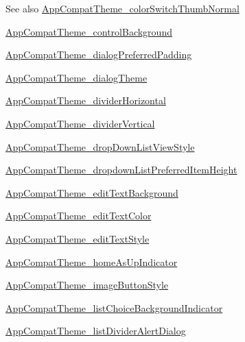 \begin{DoxySeeAlso}{See also}
\hyperlink{classandroid_1_1support_1_1v4_1_1R_1_1styleable_ae369a455853f8d39ed5e796399c80ca1}{App\+Compat\+Theme\+\_\+color\+Switch\+Thumb\+Normal} 

\hyperlink{classandroid_1_1support_1_1v4_1_1R_1_1styleable_a69fdd6182b11eb1697d971b62e02f11b}{App\+Compat\+Theme\+\_\+control\+Background} 

\hyperlink{classandroid_1_1support_1_1v4_1_1R_1_1styleable_a43f2be5deff68402fef3dcc0311e5255}{App\+Compat\+Theme\+\_\+dialog\+Preferred\+Padding} 

\hyperlink{classandroid_1_1support_1_1v4_1_1R_1_1styleable_a3574ec976e7476da7ab6c1ba08c24d15}{App\+Compat\+Theme\+\_\+dialog\+Theme} 

\hyperlink{classandroid_1_1support_1_1v4_1_1R_1_1styleable_a4f40263c3e11d2deb92c237d96ea15f0}{App\+Compat\+Theme\+\_\+divider\+Horizontal} 

\hyperlink{classandroid_1_1support_1_1v4_1_1R_1_1styleable_a480131370c6899cceeda9f48459b5bdc}{App\+Compat\+Theme\+\_\+divider\+Vertical} 

\hyperlink{classandroid_1_1support_1_1v4_1_1R_1_1styleable_a0da4ef3e81a5ae109c029dd45167387f}{App\+Compat\+Theme\+\_\+drop\+Down\+List\+View\+Style} 

\hyperlink{classandroid_1_1support_1_1v4_1_1R_1_1styleable_aff7f53164ea3cbce6587faad4b37b944}{App\+Compat\+Theme\+\_\+dropdown\+List\+Preferred\+Item\+Height} 

\hyperlink{classandroid_1_1support_1_1v4_1_1R_1_1styleable_a18052ba0b1c9793bc937f0c80db13b4f}{App\+Compat\+Theme\+\_\+edit\+Text\+Background} 

\hyperlink{classandroid_1_1support_1_1v4_1_1R_1_1styleable_a61b858b456732138a1c8d3fe6521a2a2}{App\+Compat\+Theme\+\_\+edit\+Text\+Color} 

\hyperlink{classandroid_1_1support_1_1v4_1_1R_1_1styleable_acaa134c2cef3cbfff2f66851831e5bd1}{App\+Compat\+Theme\+\_\+edit\+Text\+Style} 

\hyperlink{classandroid_1_1support_1_1v4_1_1R_1_1styleable_a99213e6dd1efe95a588f624e59528c4d}{App\+Compat\+Theme\+\_\+home\+As\+Up\+Indicator} 

\hyperlink{classandroid_1_1support_1_1v4_1_1R_1_1styleable_a549f21c88298e5099c63f6caa601fafb}{App\+Compat\+Theme\+\_\+image\+Button\+Style} 

\hyperlink{classandroid_1_1support_1_1v4_1_1R_1_1styleable_a08f9b1ee1dd8bb92832fce16a96ae03f}{App\+Compat\+Theme\+\_\+list\+Choice\+Background\+Indicator} 

\hyperlink{classandroid_1_1support_1_1v4_1_1R_1_1styleable_aeb30dd09362a7481a0324462b2ac5c82}{App\+Compat\+Theme\+\_\+list\+Divider\+Alert\+Dialog} 


\end{DoxySeeAlso}
